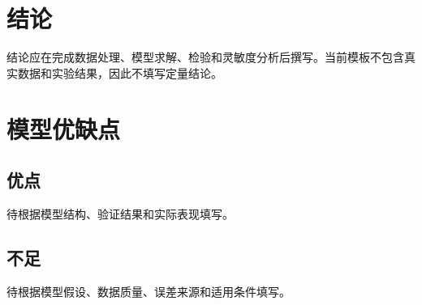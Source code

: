 \section{结论}

结论应在完成数据处理、模型求解、检验和灵敏度分析后撰写。当前模板不包含真实数据和实验结果，因此不填写定量结论。

\section{模型优缺点}

\subsection{优点}
待根据模型结构、验证结果和实际表现填写。

\subsection{不足}
待根据模型假设、数据质量、误差来源和适用条件填写。
